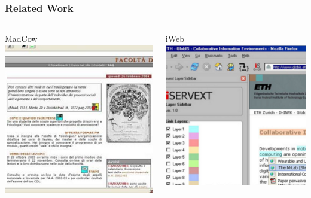 \begin{frame}
	\frametitle{Related Work}
	\begin{columns}[T]
		\begin{column}{5.5cm}
				\begin{block}{MadCow}
					\includegraphics[width=1\textwidth]{./images/highlight5.png}
				\end{block}
		\end{column}
		\begin{column}{5.5cm}
			\begin{block}{iWeb}
				\includegraphics[width=1\textwidth]{./images/highlight6.png}
			\end{block}
		\end{column}
	\end{columns}
\end{frame}
